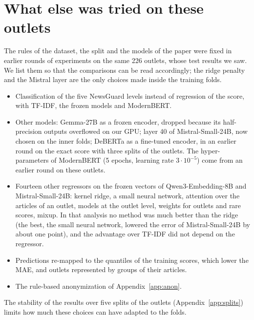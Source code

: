 \documentclass[11pt,a4paper]{article}
\begin{document}
\section{What else was tried on these outlets}\label{app:tried}
The rules of the dataset, the split and the models of the paper were fixed in earlier rounds of experiments on the same
226 outlets, whose test results we saw. We list them so that the comparisons can be read accordingly; the ridge penalty
and the Mistral layer are the only choices made inside the training folds.
\begin{itemize}
  \item Classification of the five NewsGuard levels instead of regression of the score, with TF-IDF, the frozen models
        and ModernBERT.
  \item Other models: Gemma-27B as a frozen encoder, dropped because its half-precision outputs overflowed on our GPU;
        layer 40 of Mistral-Small-24B, now chosen on the inner folds; DeBERTa as a fine-tuned encoder, in an earlier round
        on the exact score with three splits of the outlets. The hyper-parameters of ModernBERT (5 epochs, learning rate
        $3 \cdot 10^{-5}$) come from an earlier round on these outlets.
  \item Fourteen other regressors on the frozen vectors of Qwen3-Embedding-8B and Mistral-Small-24B: kernel ridge, a
        small neural network, attention over the articles of an outlet, models at the outlet level, weights for outlets
        and rare scores, mixup. In that analysis no method was much better than the ridge (the best, the small neural
        network, lowered the error of Mistral-Small-24B by about one point), and the advantage over TF-IDF did not depend
        on the regressor.
  \item Predictions re-mapped to the quantiles of the training scores, which lower the MAE, and outlets represented by
        groups of their articles.
  \item The rule-based anonymization of Appendix~\ref{app:anon}.
\end{itemize}
The stability of the results over five splits of the outlets (Appendix~\ref{app:splits}) limits how much these choices
can have adapted to the folds.
\end{document}
